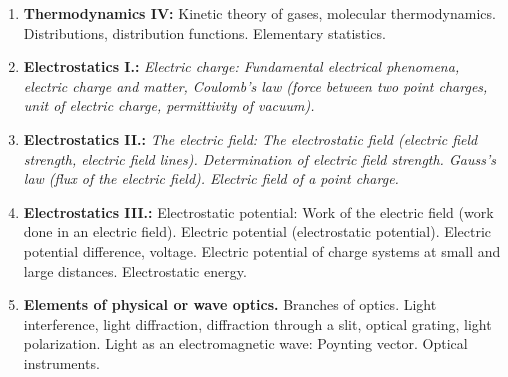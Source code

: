 \documentclass[t,aspectratio=169]{beamer}
\begin{document}
\begin{frame}
\begin{enumerate}
\item \textbf{Thermodynamics IV:} Kinetic theory of gases, molecular thermodynamics. Distributions, distribution functions. Elementary statistics.
\item \textbf{Electrostatics I.:} \textit{Electric charge: Fundamental electrical phenomena, electric charge and matter, Coulomb’s law (force between two point charges, unit of electric charge, permittivity of vacuum).}
\item \textbf{Electrostatics II.:} \textit{The electric field: The electrostatic field (electric field strength, electric field lines). Determination of electric field strength. Gauss’s law (flux of the electric field). Electric field of a point charge.}
\pagebreak
\item \textbf{Electrostatics III.:} Electrostatic potential: Work of the electric field (work done in an electric field). Electric potential (electrostatic potential). Electric potential difference, voltage. Electric potential of charge systems at small and large distances. Electrostatic energy.
\item \textbf{Elements of physical or wave optics.} Branches of optics. Light interference, light diffraction, diffraction through a slit, optical grating, light polarization. Light as an electromagnetic wave: Poynting vector. Optical instruments.
\end{enumerate}
\end{frame}

\end{document}
